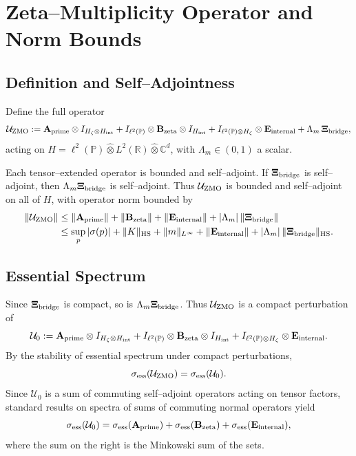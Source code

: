 \documentclass[11pt]{article}
\begin{document}
\section{Zeta–Multiplicity Operator and Norm Bounds}

\subsection{Definition and Self–Adjointness}

Define the full operator
\[
  \mathcal{U}_{\rm ZMO}
  := \mathbf{A}_{\rm prime} \otimes I_{H_\zeta\otimes H_{\rm int}}
     + I_{\ell^2(\mathbb{P})}\otimes \mathbf{B}_{\rm zeta} \otimes I_{H_{\rm int}}
     + I_{\ell^2(\mathbb{P})\otimes H_\zeta}\otimes \mathbf{E}_{\rm internal}
     + \Lambda_m\, \mathbf{\Xi}_{\rm bridge},
\]
acting on \(H = \ell^2(\mathbb{P})\widehat{\otimes}L^2(\mathbb{R})\widehat{\otimes}\mathbb{C}^d\), with \(\Lambda_m\in(0,1)\) a scalar.

Each tensor–extended operator is bounded and self–adjoint. If \(\mathbf{\Xi}_{\rm bridge}\) is self–adjoint, then \(\Lambda_m \mathbf{\Xi}_{\rm bridge}\) is self–adjoint. Thus \(\mathcal{U}_{\rm ZMO}\) is bounded and self–adjoint on all of \(H\), with operator norm bounded by
\begin{align*}
  \|\mathcal{U}_{\rm ZMO}\|
  &\le \|\mathbf{A}_{\rm prime}\| + \|\mathbf{B}_{\rm zeta}\| + \|\mathbf{E}_{\rm internal}\|
       + |\Lambda_m|\,\|\mathbf{\Xi}_{\rm bridge}\| \\
  &\le \sup_p|\sigma(p)| + \|K\|_{\rm HS} + \|m\|_{L^\infty}
       + \|\mathbf{E}_{\rm internal}\|
       + |\Lambda_m|\,\|\mathbf{\Xi}_{\rm bridge}\|_{\rm HS}.
\end{align*}

\subsection{Essential Spectrum}

Since \(\mathbf{\Xi}_{\rm bridge}\) is compact, so is \(\Lambda_m\mathbf{\Xi}_{\rm bridge}\). Thus \(\mathcal{U}_{\rm ZMO}\) is a compact perturbation of
\[
  \mathcal{U}_0
  := \mathbf{A}_{\rm prime} \otimes I_{H_\zeta\otimes H_{\rm int}}
     + I_{\ell^2(\mathbb{P})}\otimes \mathbf{B}_{\rm zeta} \otimes I_{H_{\rm int}}
     + I_{\ell^2(\mathbb{P})\otimes H_\zeta}\otimes \mathbf{E}_{\rm internal}.
\]
By the stability of essential spectrum under compact perturbations,
\[
  \sigma_{\rm ess}(\mathcal{U}_{\rm ZMO})
  = \sigma_{\rm ess}(\mathcal{U}_0).
\]
Since \(\mathcal{U}_0\) is a sum of commuting self–adjoint operators acting on tensor factors, standard results on spectra of sums of commuting normal operators yield
\[
  \sigma_{\rm ess}(\mathcal{U}_0)
  = \sigma_{\rm ess}(\mathbf{A}_{\rm prime})
    + \sigma_{\rm ess}(\mathbf{B}_{\rm zeta})
    + \sigma_{\rm ess}(\mathbf{E}_{\rm internal}),
\]
where the sum on the right is the Minkowski sum of the sets.\medskip
\end{document}
